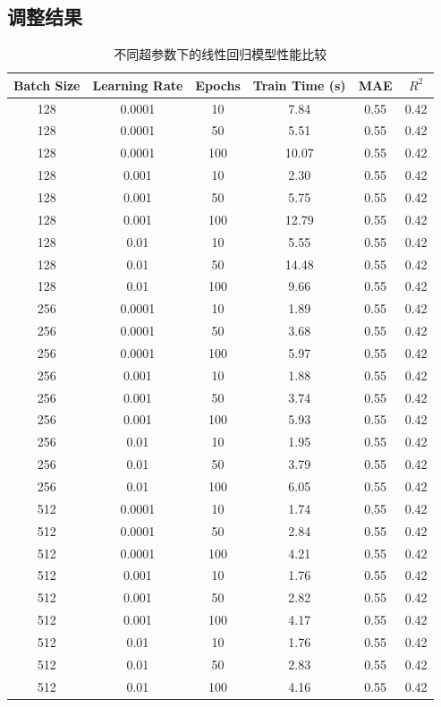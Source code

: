 \documentclass[12pt]{article}
\begin{document}
\subsection{调整结果}
\begin{table}[htbp]
\centering
\caption{不同超参数下的线性回归模型性能比较}
\begin{tabular}{cccccc}
\hline
\textbf{Batch Size} & \textbf{Learning Rate} & \textbf{Epochs} & \textbf{Train Time (s)} & \textbf{MAE} & \textbf{$R^2$} \\
\hline
128 & 0.0001 & 10 & 7.84 & 0.55 & 0.42 \\
128 & 0.0001 & 50 & 5.51 & 0.55 & 0.42 \\
128 & 0.0001 & 100 & 10.07 & 0.55 & 0.42 \\
128 & 0.001 & 10 & 2.30 & 0.55 & 0.42 \\
128 & 0.001 & 50 & 5.75 & 0.55 & 0.42 \\
128 & 0.001 & 100 & 12.79 & 0.55 & 0.42 \\
128 & 0.01 & 10 & 5.55 & 0.55 & 0.42 \\
128 & 0.01 & 50 & 14.48 & 0.55 & 0.42 \\
128 & 0.01 & 100 & 9.66 & 0.55 & 0.42 \\
256 & 0.0001 & 10 & 1.89 & 0.55 & 0.42 \\
256 & 0.0001 & 50 & 3.68 & 0.55 & 0.42 \\
256 & 0.0001 & 100 & 5.97 & 0.55 & 0.42 \\
256 & 0.001 & 10 & 1.88 & 0.55 & 0.42 \\
256 & 0.001 & 50 & 3.74 & 0.55 & 0.42 \\
256 & 0.001 & 100 & 5.93 & 0.55 & 0.42 \\
256 & 0.01 & 10 & 1.95 & 0.55 & 0.42 \\
256 & 0.01 & 50 & 3.79 & 0.55 & 0.42 \\
256 & 0.01 & 100 & 6.05 & 0.55 & 0.42 \\
512 & 0.0001 & 10 & 1.74 & 0.55 & 0.42 \\
512 & 0.0001 & 50 & 2.84 & 0.55 & 0.42 \\
512 & 0.0001 & 100 & 4.21 & 0.55 & 0.42 \\
512 & 0.001 & 10 & 1.76 & 0.55 & 0.42 \\
512 & 0.001 & 50 & 2.82 & 0.55 & 0.42 \\
512 & 0.001 & 100 & 4.17 & 0.55 & 0.42 \\ 
512 & 0.01 & 10 & 1.76 & 0.55 & 0.42 \\
512 & 0.01 & 50 & 2.83 & 0.55 & 0.42 \\
512 & 0.01 & 100 & 4.16 & 0.55 & 0.42 \\
\hline
\end{tabular}
\label{tab:regression_results}
\end{table}
\end{document}
